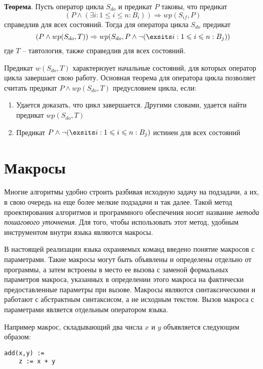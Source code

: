 \textbf{Теорема}. Пусть оператор цикла $S_{do}$ и предикат $P$ таковы, что предикат
\begin{equation}
	(P \wedge (\exists i: 1 \leq i \leq n: B_i)) \Rightarrow wp(S_{if}, P)
\end{equation}
справедлив для всех состояний. Тогда для оператора цикла $S_{do}$ предикат
\begin{equation}
	(P \wedge wp(S_{do}, T)) \Rightarrow wp(S_{do}, P \wedge \neg (\exsits i: 1 \leq i \leq n: B_j))
\end{equation}
где $T$ -- тавтология, также справедлив для всех состояний.

Предикат $w(S_{do}, T)$ характеризует начальные состояний, для которых оператор цикла завершает свою работу.
Основная теорема для оператора цикла позволяет считать предикат $P \wedge wp(S_{do}, T)$ предусловием цикла, если:
\begin{enumerate}
	\item Удается доказать, что цикл завершается. Другими словами, удается найти предикат $wp(S_{do}, T)$
	\item Предикат $P \wedge \neg (\exsits i: 1 \leq i \leq n: B_j)$ истинен для всех состояний
\end{enumerate}

\section{Макросы}
Многие алгоритмы удобно строить разбивая исходную задачу на подзадачи, а их, в свою очередь
на еще более мелкие подзадачи и так далее. Такой метод проектирования алгоритмов и программного
обеспечения носит название \textit{метода пошагового уточнения}. Для
того, чтобы использовать этот метод, удобным инструментом внутри языка являются макросы.

В настоящей реализации языка охраняемых команд введено понятие макросов с параметрами.
Такие макросы могут быть объявлены и определены отдельно от программы, а затем встроены в место ее вызова с 
заменой формальных параметров макроса, указанных в определении этого макроса на фактически предоставленные параметры при вызове. Макросы
являются синтаксическими и работают с абстрактным синтаксисом, а не исходным текстом.
Вызов макроса с параметрами является отдельным оператором языка. 

Например макрос, складывающий два числа $x$ и $y$ объявляется следующим образом:

\begin{verbatim}
add(x,y) :=
    z := x + y 
\end{verbatim}

